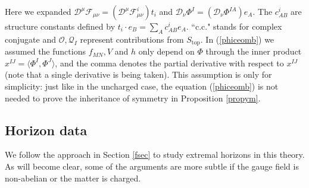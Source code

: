 \documentclass[11pt, reqno]{amsart}
\theoremstyle{plain}
\theoremstyle{definition}
\numberwithin{equation}{section}
\begin{document}
Here we expanded $\mathcal{D}^\mu\mathcal{F}_{\mu\nu} = (\mathcal{D}^\mu\mathcal{F}_{\mu\nu}^i)t_i$ and $\mathcal{D}_\nu\Phi^I = (\mathcal{D}_\nu\Phi^{IA})e_A$. The $c^i_{AB}$ are structure constants defined by $t_i \cdot e_B = \sum_A c_{AB}^ie_A$. ``c.c." stands for complex conjugate and $\mathcal{O}, \mathcal{Q}_I$ represent contributions from $S_{\text{top}}$. In (\ref{phiceomb}) we assumed the functions $f_{MN},V$ and $h$ only depend on $\Phi$ through the inner product $x^{IJ} = \langle \Phi^I,\Phi^J\rangle$, and the comma denotes the partial derivative with respect to $x^{IJ}$ (note that a single derivative is being taken). This assumption is only for simplicity: just like in the uncharged case, the equation (\ref{phiceomb}) is not needed to prove the inheritance of symmetry in Proposition \ref{propym}.

\subsection{Horizon data} We follow the approach in Section \ref{fsec} to study extremal horizons in this theory. As will become clear, some of the arguments are more subtle if the gauge field is non-abelian or the matter is charged.
\end{document}
